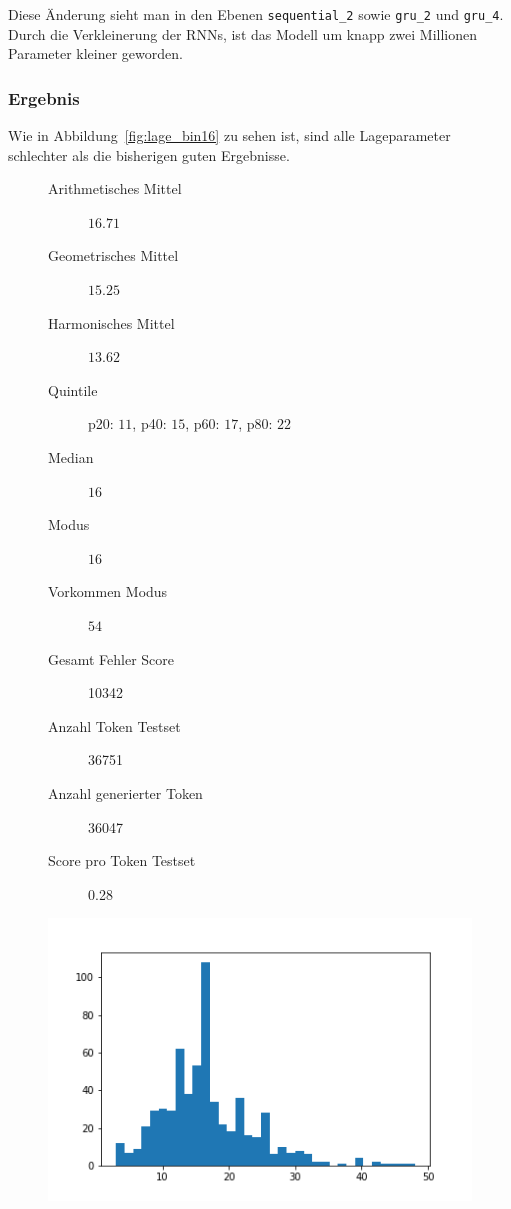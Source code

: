 \documentclass[pdftex,a4paper,halfparskip, article]{scrartcl}
\begin{document}
Diese Änderung sieht man in den Ebenen \texttt{sequential\_2} sowie \texttt{gru\_2} und \texttt{gru\_4}.
Durch die Verkleinerung der RNNs, ist das Modell um knapp zwei Millionen Parameter kleiner geworden.

\subsubsection*{Ergebnis}


Wie in Abbildung~\ref{fig:lage_bin16} zu sehen ist, sind alle Lageparameter schlechter als die bisherigen guten Ergebnisse.

\begin{figure}
\centering
\begin{minipage}{.5\textwidth}
  \centering
  \begin{description}
	\item[Arithmetisches Mittel] $16.71$	
	\item[Geometrisches Mittel] $15.25$
	\item[Harmonisches Mittel] $13.62$
	\item[Quintile] p20: $11$, p40: $15$, p60: $17$, p80: $22$
	\item[Median] $16$
	\item[Modus] $16$
	\item[Vorkommen Modus] $54$
	\item[Gesamt Fehler Score] 10342
	\item[Anzahl Token Testset] 36751 
	\item[Anzahl generierter Token] 36047
	\item[Score pro Token Testset]  0.28
\end{description}
  \label{fig:lage_bin16}
\end{minipage}%
\begin{minipage}{.5\textwidth}
  \centering
  \includegraphics[width=1\linewidth]{predictions_bin16_histogramm}
  \label{fig:hist_bin16}
\end{minipage}
\end{figure}
\end{document}

